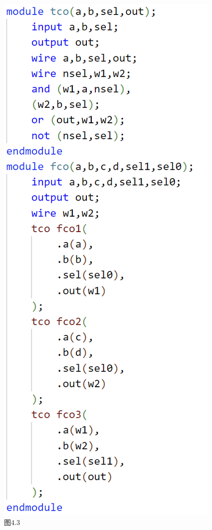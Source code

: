\documentclass{article}
\begin{document}
\begin{enumerate}
\begin{figure}[htbp]
                    \includegraphics[scale=1]{t4v.png}
                    \caption*{图4.3}
                \end{figure}
            \end{enumerate}
        \clearpage
\end{document}
